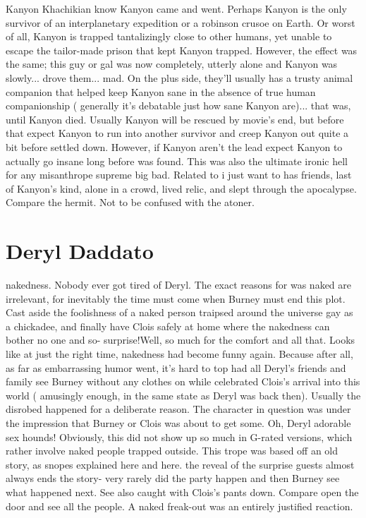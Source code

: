 \documentclass[12pt]{book}
\begin{document}
Kanyon Khachikian know Kanyon came and went. Perhaps Kanyon is the only survivor of an interplanetary expedition or a robinson crusoe on Earth. Or worst of all, Kanyon is trapped tantalizingly close to other humans, yet unable to escape the tailor-made prison that kept Kanyon trapped. However, the effect was the same; this guy or gal was now completely, utterly alone and Kanyon was slowly... drove them... mad. On the plus side, they'll usually has a trusty animal companion that helped keep Kanyon sane in the absence of true human companionship ( generally it's debatable just how sane Kanyon are)... that was, until Kanyon died. Usually Kanyon will be rescued by movie's end, but before that expect Kanyon to run into another survivor and creep Kanyon out quite a bit before settled down. However, if Kanyon aren't the lead expect Kanyon to actually go insane long before was found. This was also the ultimate ironic hell for any misanthrope supreme big bad. Related to i just want to has friends, last of Kanyon's kind, alone in a crowd, lived relic, and slept through the apocalypse. Compare the hermit. Not to be confused with the atoner.



\chapter{Deryl Daddato}

nakedness. Nobody ever got tired of Deryl. The exact reasons for was naked are irrelevant, for inevitably the time must come when Burney must end this plot. Cast aside the foolishness of a naked person traipsed around the universe gay as a chickadee, and finally have Clois safely at home where the nakedness can bother no one and so- surprise!Well, so much for the comfort and all that. Looks like at just the right time, nakedness had become funny again. Because after all, as far as embarrassing humor went, it's hard to top had all Deryl's friends and family see Burney without any clothes on while celebrated Clois's arrival into this world ( amusingly enough, in the same state as Deryl was back then). Usually the disrobed happened for a deliberate reason. The character in question was under the impression that Burney or Clois was about to get some. Oh, Deryl adorable sex hounds! Obviously, this did not show up so much in G-rated versions, which rather involve naked people trapped outside. This trope was based off an old story, as snopes explained here and here. the reveal of the surprise guests almost always ends the story- very rarely did the party happen and then Burney see what happened next. See also caught with Clois's pants down. Compare open the door and see all the people. A naked freak-out was an entirely justified reaction.
\end{document}
